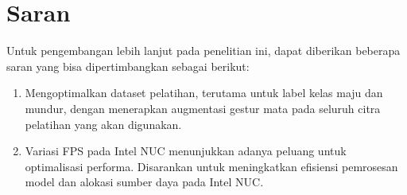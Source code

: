\section{Saran}
\label{chap:saran}

Untuk pengembangan lebih lanjut pada penelitian ini, dapat diberikan beberapa saran yang bisa dipertimbangkan sebagai berikut:

\begin{enumerate}[nolistsep]

  \item Mengoptimalkan dataset pelatihan, terutama untuk label kelas maju dan mundur, dengan menerapkan augmentasi gestur mata pada seluruh citra pelatihan yang akan digunakan.
  
  \item Variasi FPS pada Intel NUC menunjukkan adanya peluang untuk optimalisasi performa. Disarankan untuk meningkatkan efisiensi pemrosesan model dan alokasi sumber daya pada Intel NUC.

\end{enumerate}
